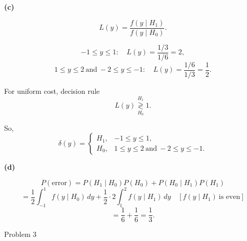 \documentclass[12pt,a4paper,onecolumn]{exam}
\newcommand{\questionheader}[1]{%
  \begin{tcolorbox}[
    enhanced,
    colback=black,
    coltext=white,
    boxrule=0pt,
    fontupper=\Large\bfseries,
    arc=4mm
  ]
  #1
  \end{tcolorbox}%
}
\begin{document}
\begin{solution}
\textbf{(c)}

\[
L(y)=\frac{f(y\mid H_1)}{f(y\mid H_0)}.
\]

\[
-1\le y\le 1:\quad L(y)=\frac{1/3}{1/6}=2,
\]
\[
1\le y\le 2\ \text{and}\ -2\le y\le -1:\quad L(y)=\frac{1/6}{1/3}=\frac{1}{2}.
\]

For uniform cost, decision rule
\[
L(y)\underset{H_0}{\overset{H_1}{\gtrless}}1.
\]

So,
\[
\delta(y)=
\begin{cases}
H_1, & -1\le y\le 1,\\
H_0, & 1\le y\le 2\ \text{and}\ -2\le y\le -1.
\end{cases}
\]

\textbf{(d)}

\[
P(\text{error})=P(H_1\mid H_0)P(H_0)+P(H_0\mid H_1)P(H_1)
\]
\[
=\frac{1}{2}\int_{-1}^{1}f(y\mid H_0)\,dy
+\frac{1}{2}\cdot 2\int_{1}^{2}f(y\mid H_1)\,dy
\quad [f(y\mid H_1)\ \text{is even}]
\]
\[
=\frac{1}{6}+\frac{1}{6}=\frac{1}{3}.
\]

\enlargethispage{12pt}
\end{solution}

\questionheader{Problem 3}
\end{document}
